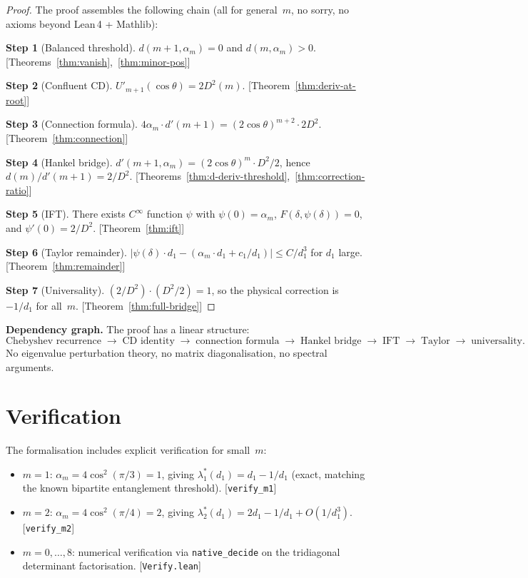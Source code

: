 \documentclass[11pt,a4paper]{article}
\theoremstyle{plain}
\theoremstyle{definition}
\newcommand{\Dsq}{D^2}
\newcommand{\alpham}{\alpha_m}
\newcommand{\chebU}{U}
\newcommand{\lean}[1]{\texttt{#1}}
\begin{document}
\begin{proof}
The proof assembles the following chain (all for general~$m$,
no sorry, no axioms beyond Lean\,4 + Mathlib):

\medskip
\noindent\textbf{Step 1} (Balanced threshold).
$d(m{+}1, \alpham) = 0$ and $d(m, \alpham) > 0$.
\hfill [Theorems~\ref{thm:vanish},~\ref{thm:minor-pos}]

\smallskip
\noindent\textbf{Step 2} (Confluent CD).
$\chebU'_{m+1}(\cos\theta) = 2\Dsq(m)$.
\hfill [Theorem~\ref{thm:deriv-at-root}]

\smallskip
\noindent\textbf{Step 3} (Connection formula).
$4\alpham \cdot d'(m{+}1) = (2\cos\theta)^{m+2} \cdot 2\Dsq$.
\hfill [Theorem~\ref{thm:connection}]

\smallskip
\noindent\textbf{Step 4} (Hankel bridge).
$d'(m{+}1,\alpham) = (2\cos\theta)^m \cdot \Dsq/2$,
hence $d(m)/d'(m{+}1) = 2/\Dsq$.
\hfill [Theorems~\ref{thm:d-deriv-threshold},~\ref{thm:correction-ratio}]

\smallskip
\noindent\textbf{Step 5} (IFT).
There exists $C^\infty$ function $\psi$ with
$\psi(0) = \alpham$, $F(\delta,\psi(\delta)) = 0$,
and $\psi'(0) = 2/\Dsq$.
\hfill [Theorem~\ref{thm:ift}]

\smallskip
\noindent\textbf{Step 6} (Taylor remainder).
$|\psi(\delta) \cdot d_1 - (\alpham \cdot d_1 + c_1/d_1)| \le C/d_1^3$
for $d_1$ large.
\hfill [Theorem~\ref{thm:remainder}]

\smallskip
\noindent\textbf{Step 7} (Universality).
$(2/\Dsq) \cdot (\Dsq/2) = 1$, so the physical correction
is $-1/d_1$ for all~$m$.
\hfill [Theorem~\ref{thm:full-bridge}]
\end{proof}

\medskip
\noindent\textbf{Dependency graph.}
The proof has a linear structure:
\[
  \text{Chebyshev recurrence}
  \;\to\; \text{CD identity}
  \;\to\; \text{connection formula}
  \;\to\; \text{Hankel bridge}
  \;\to\; \text{IFT}
  \;\to\; \text{Taylor}
  \;\to\; \text{universality}.
\]
No eigenvalue perturbation theory, no matrix diagonalisation,
no spectral arguments.

\section{Verification}
\label{sec:verify}

The formalisation includes explicit verification for small~$m$:

\begin{itemize}[leftmargin=2em]
  \item $m=1$: $\alpham = 4\cos^2(\pi/3) = 1$, giving
    $\lambda^*_1(d_1) = d_1 - 1/d_1$ (exact, matching the known
    bipartite entanglement threshold).
    [\lean{verify\_m1}]
  \item $m=2$: $\alpham = 4\cos^2(\pi/4) = 2$, giving
    $\lambda^*_2(d_1) = 2d_1 - 1/d_1 + O(1/d_1^3)$.
    [\lean{verify\_m2}]
  \item $m=0,\ldots,8$: numerical verification via
    \lean{native\_decide} on the tridiagonal determinant factorisation.
    [\lean{Verify.lean}]
\end{itemize}
\end{document}

